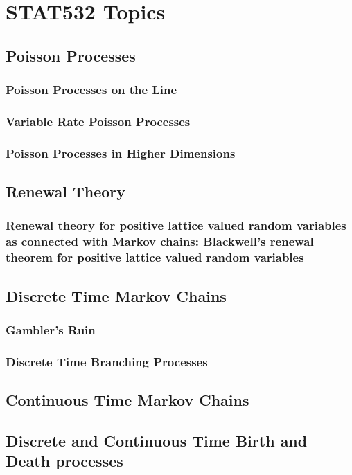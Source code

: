 \part{STAT532 Topics}
\chapter{Poisson Processes}
\section{Poisson Processes on the Line}
\section{Variable Rate Poisson Processes}
\section{Poisson Processes in Higher Dimensions}

\chapter{Renewal Theory}   
\section{Renewal theory for positive lattice valued random variables as connected with Markov chains: Blackwell's renewal theorem for positive lattice valued random variables}

\chapter{Discrete Time Markov Chains}
\section{Gambler's Ruin}
\section{Discrete Time Branching Processes}

\chapter{Continuous Time Markov Chains}

\chapter{Discrete and Continuous Time Birth and Death processes}
